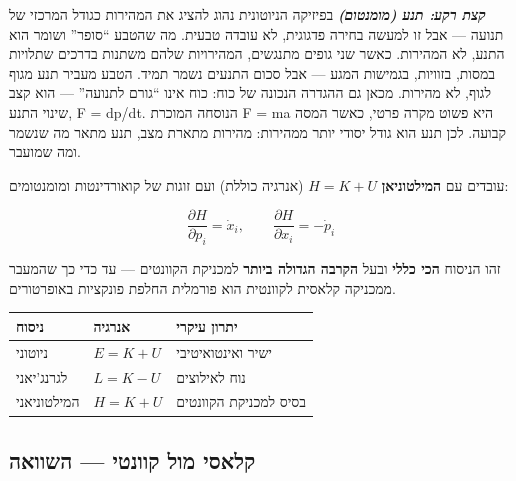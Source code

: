 \documentclass[
  hebrew,
  letterpaper,
  DIV=11,
  numbers=noendperiod]{scrreprt}
\newcounter{none} %
\begin{document}
\textbf{\emph{קצת רקע: תנע (מומנטום)}} בפיזיקה הניוטונית נהוג להציג את
המהירות כגודל המרכזי של תנועה --- אבל זו למעשה בחירה פדגוגית, לא עובדה
טבעית. מה שהטבע ``סופר'' ושומר הוא התנע, לא המהירות. כאשר שני גופים
מתנגשים, המהירויות שלהם משתנות בדרכים שתלויות במסות, בזוויות, בגמישות
המגע --- אבל סכום התנעים נשמר תמיד. הטבע מעביר תנע מגוף לגוף, לא מהירות.
מכאן גם ההגדרה הנכונה של כוח: כוח אינו ``גורם לתנועה'' --- הוא קצב שינוי
התנע, F = dp/dt. הנוסחה המוכרת F = ma היא פשוט מקרה פרטי, כאשר המסה
קבועה. לכן תנע הוא גודל יסודי יותר ממהירות: מהירות מתארת מצב, תנע מתאר
מה שנשמר ומה
שמועבר.\hspace{0pt}\hspace{0pt}\hspace{0pt}\hspace{0pt}\hspace{0pt}\hspace{0pt}\hspace{0pt}\hspace{0pt}\hspace{0pt}\hspace{0pt}\hspace{0pt}\hspace{0pt}\hspace{0pt}\hspace{0pt}\hspace{0pt}\hspace{0pt}

עובדים עם \textbf{המילטוניאן} \(H = K + U\) (אנרגיה כוללת) ועם זוגות של
קואורדינטות ומומנטומים:

\[\frac{\partial H}{\partial p_i} = \dot{x}_i, \qquad \frac{\partial H}{\partial x_i} = -\dot{p}_i\]

זהו הניסוח \textbf{הכי כללי} ובעל \textbf{הקרבה הגדולה ביותר} למכניקת
הקוונטים --- עד כדי כך שהמעבר ממכניקה קלאסית לקוונטית הוא פורמלית החלפת
פונקציות באופרטורים.

{\def\LTcaptype{none} %
\begin{longtable}[]{@{}lll@{}}
\toprule\noalign{}
ניסוח & אנרגיה & יתרון עיקרי \\
\midrule\noalign{}
\endhead
\bottomrule\noalign{}
\endlastfoot
ניוטוני & \(E = K + U\) & ישיר ואינטואיטיבי \\
לגרנג'יאני & \(L = K - U\) & נוח לאילוצים \\
המילטוניאני & \(H = K + U\) & בסיס למכניקת הקוונטים \\
\end{longtable}
}

\subsection{קלאסי מול קוונטי ---
השוואה}\label{ux5e7ux5dcux5d0ux5e1ux5d9-ux5deux5d5ux5dc-ux5e7ux5d5ux5d5ux5e0ux5d8ux5d9-ux5d4ux5e9ux5d5ux5d5ux5d0ux5d4}
\end{document}
